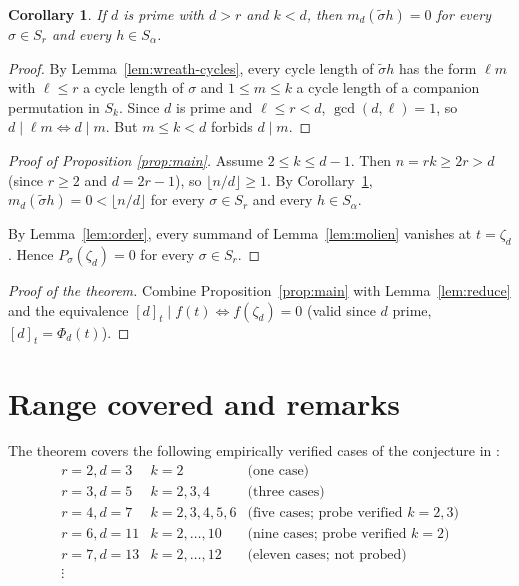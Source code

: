 \documentclass[11pt]{article}
\newtheorem{corollary}[theorem]{Corollary}
\theoremstyle{definition}
\theoremstyle{remark}
\begin{document}
\begin{corollary}\label{cor:no-d-cycle}
If $d$ is prime with $d > r$ and $k < d$, then $m_d(\tilde\sigma h) = 0$
for every $\sigma \in S_r$ and every $h \in S_\alpha$.
\end{corollary}

\begin{proof}
By Lemma~\ref{lem:wreath-cycles}, every cycle length of $\tilde\sigma h$
has the form $\ell m$ with $\ell \le r$ a cycle length of $\sigma$ and
$1 \le m \le k$ a cycle length of a companion permutation in $S_k$. Since
$d$ is prime and $\ell \le r < d$, $\gcd(d, \ell) = 1$, so
$d \mid \ell m \iff d \mid m$. But $m \le k < d$ forbids $d \mid m$.
\end{proof}

\begin{proof}[Proof of Proposition \ref{prop:main}]
Assume $2 \le k \le d - 1$. Then $n = rk \ge 2r > d$ (since $r \ge 2$ and
$d = 2r - 1$), so $\lfloor n/d \rfloor \ge 1$. By
Corollary~\ref{cor:no-d-cycle}, $m_d(\tilde\sigma h) = 0 < \lfloor n/d \rfloor$
for every $\sigma \in S_r$ and every $h \in S_\alpha$.

By Lemma~\ref{lem:order}, every summand of
Lemma~\ref{lem:molien} vanishes at $t = \zeta_d$. Hence
$P_\sigma(\zeta_d) = 0$ for every $\sigma \in S_r$.
\end{proof}

\begin{proof}[Proof of the theorem]
Combine Proposition~\ref{prop:main} with Lemma~\ref{lem:reduce} and
the equivalence $[d]_t \mid f(t) \iff f(\zeta_d) = 0$ (valid since $d$
prime, $[d]_t = \Phi_d(t)$).
\end{proof}

\section{Range covered and remarks}

The theorem covers the following empirically verified cases of the
conjecture in \cite{PROVE-2026-07-31}:
\[
\begin{array}{lll}
r = 2, d = 3 & k = 2 & \text{(one case)}\\
r = 3, d = 5 & k = 2, 3, 4 & \text{(three cases)}\\
r = 4, d = 7 & k = 2, 3, 4, 5, 6 & \text{(five cases; probe verified $k=2,3$)}\\
r = 6, d = 11 & k = 2, \ldots, 10 & \text{(nine cases; probe verified $k=2$)}\\
r = 7, d = 13 & k = 2, \ldots, 12 & \text{(eleven cases; not probed)}\\
\vdots
\end{array}
\]
\end{document}
